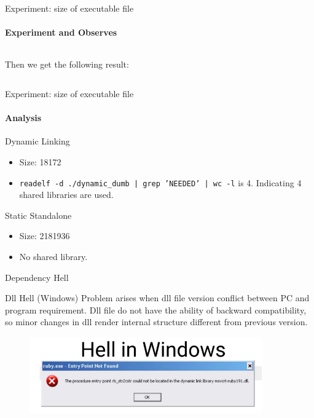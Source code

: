 \begin{frame}{Experiment: size of executable file}
    \framesubtitle{Experiment and Observes}
    \inputminted[fontsize=\tiny]{cpp}{code/week7/dumb.cpp}

    Then we get the following result:

    \inputminted[fontsize=\tiny]{shell-session}{code/week7/experiment_res.txt}
\end{frame}

\begin{frame}{Experiment: size of executable file}
    \framesubtitle{Analysis}
    \begin{block}{Dynamic Linking}
        \begin{itemize}
        \item Size: 18172
        \item \texttt{readelf -d ./dynamic\_dumb | grep 'NEEDED' | wc -l} is
            4. Indicating 4 shared libraries are used.
        \end{itemize}
    \end{block}
    \begin{block}{Static Standalone}
        \begin{itemize}
        \item Size: 2181936
        \item No shared library.
        \end{itemize}
    \end{block}
\end{frame}

\begin{frame}{Dependency Hell}
    \begin{block}{Dll Hell (Windows)}
        Problem arises when dll file version conflict between PC and program
        requirement. Dll file do not have the ability of backward compatibility,
        so minor changes in dll render internal structure different from
        previous version.
        \begin{figure}[htbp!]
            \includegraphics[width=10cm]{img/week7/dll_hell.png}
        \end{figure}
    \end{block}
\end{frame}

